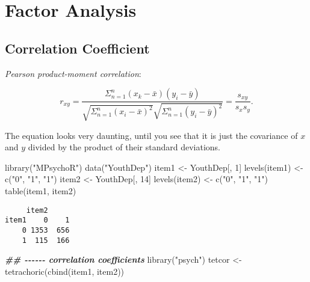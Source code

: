 \documentclass[
]{book}
\newenvironment{Shaded}{\begin{snugshade}}{\end{snugshade}}
\newcommand{\DecValTok}[1]{\textcolor[rgb]{0.00,0.00,0.81}{#1}}
\newcommand{\DocumentationTok}[1]{\textcolor[rgb]{0.56,0.35,0.01}{\textbf{\textit{#1}}}}
\newcommand{\FunctionTok}[1]{\textcolor[rgb]{0.00,0.00,0.00}{#1}}
\newcommand{\NormalTok}[1]{#1}
\newcommand{\OtherTok}[1]{\textcolor[rgb]{0.56,0.35,0.01}{#1}}
\newcommand{\StringTok}[1]{\textcolor[rgb]{0.31,0.60,0.02}{#1}}
\begin{document}
\hypertarget{factor-analysis}{%
\chapter{Factor Analysis}\label{factor-analysis}}

\hypertarget{correlation-coefficient}{%
\section{Correlation Coefficient}\label{correlation-coefficient}}

\emph{Pearson product-moment correlation}:

\[
r_{xy} = \frac{\Sigma_{n=1}^n (x_k - \bar{x})(y_i - \bar{y})}{\sqrt{\Sigma_{n=1}^n(x_i - \bar{x})^2} \sqrt{\Sigma_{n=1}^n(y_i - \bar{y})^2}} = \frac{s_{xy}}{s_x s_y}.
\]

The equation looks very daunting, until you see that it is just the covariance of \(x\) and \(y\) divided by the product of their standard deviations.

\begin{Shaded}
\begin{Highlighting}[]
\FunctionTok{library}\NormalTok{(}\StringTok{"MPsychoR"}\NormalTok{)}
\FunctionTok{data}\NormalTok{(}\StringTok{"YouthDep"}\NormalTok{)}
\NormalTok{item1 }\OtherTok{\textless{}{-}}\NormalTok{ YouthDep[, }\DecValTok{1}\NormalTok{]}
\FunctionTok{levels}\NormalTok{(item1) }\OtherTok{\textless{}{-}} \FunctionTok{c}\NormalTok{(}\StringTok{"0"}\NormalTok{, }\StringTok{"1"}\NormalTok{, }\StringTok{"1"}\NormalTok{)}
\NormalTok{item2 }\OtherTok{\textless{}{-}}\NormalTok{ YouthDep[, }\DecValTok{14}\NormalTok{]}
\FunctionTok{levels}\NormalTok{(item2) }\OtherTok{\textless{}{-}} \FunctionTok{c}\NormalTok{(}\StringTok{"0"}\NormalTok{, }\StringTok{"1"}\NormalTok{, }\StringTok{"1"}\NormalTok{)}
\FunctionTok{table}\NormalTok{(item1, item2)}
\end{Highlighting}
\end{Shaded}

\begin{verbatim}
     item2
item1    0    1
    0 1353  656
    1  115  166
\end{verbatim}

\begin{Shaded}
\begin{Highlighting}[]
\DocumentationTok{\#\# {-}{-}{-}{-}{-}{-} correlation coefficients}
\FunctionTok{library}\NormalTok{(}\StringTok{"psych"}\NormalTok{)}
\NormalTok{tetcor }\OtherTok{\textless{}{-}} \FunctionTok{tetrachoric}\NormalTok{(}\FunctionTok{cbind}\NormalTok{(item1, item2))}
\end{Highlighting}
\end{Shaded}
\end{document}
